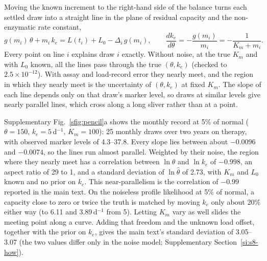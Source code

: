 Moving the known increment to the right-hand side of the balance turns each settled draw
into a straight line in the plane of residual capacity and the non-enzymatic rate constant,
\begin{equation}
\label{seq:s1-pencil}
g(m_i)\,\theta+m_i\,k_e=L(t_i)+L_0-\Delta_i\,g(m_i),
\qquad \frac{dk_e}{d\theta}=-\frac{g(m_i)}{m_i}=-\frac{1}{K_m+m_i}.
\end{equation}
Every point on line $i$ explains draw $i$ exactly. Without noise, at the true $K_m$ and with
$L_0$ known, all the lines pass through the true $(\theta,k_e)$ (checked to
$2.5\times10^{-12}$). With assay and load-record error they nearly meet, and the region in
which they nearly meet is the uncertainty of $(\theta,k_e)$ at fixed $K_m$. The slope of
each line depends only on that draw's marker level, so draws at similar levels give nearly
parallel lines, which cross along a long sliver rather than at a point.

Supplementary Fig.~\ref{sfig:pencil}a shows the monthly record at 5\% of normal ($\theta=150$\um,
$k_e=5$\,d$^{-1}$, $K_m=100$\uM): 25 monthly draws over two years on therapy, with observed
marker levels of 4.3--37.8\uM. Every slope lies between about $-0.0096$ and $-0.0074$, so
the lines run almost parallel. Weighted by their noise, the region where they nearly meet
has a correlation between $\ln\theta$ and $\ln k_e$ of $-0.998$, an aspect ratio of 29 to 1,
and a standard deviation of $\ln\hat\theta$ of 2.73, with $K_m$ and $L_0$ known and no prior
on $k_e$. This near-parallelism is the correlation of $-0.99$ reported in the main text. On
the noiseless profile likelihood at 5\% of normal, a capacity close to zero or twice the
truth is matched by moving $k_e$ only about 20\% either way (to 6.11 and 3.89\,d$^{-1}$
from 5). Letting $K_m$ vary as well slides the meeting point along a curve. Adding that
freedom and the unknown load offset, together with the prior on $k_e$, gives the main text's
standard deviation of 3.05--3.07 (the two values differ only in the noise model;
Supplementary Section~\ref{si:s8-how}).

